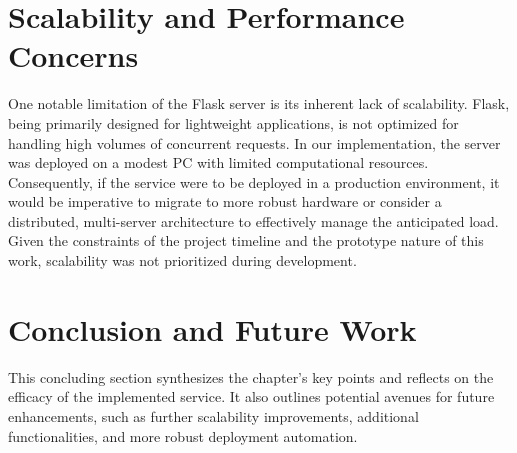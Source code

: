 \author{Florian Prandstetter}

\section{Scalability and Performance Concerns}

One notable limitation of the Flask server is its inherent lack of scalability. Flask, being primarily designed for lightweight applications, is not optimized for handling high volumes of concurrent requests. In our implementation, the server was deployed on a modest PC with limited computational resources. Consequently, if the service were to be deployed in a production environment, it would be imperative to migrate to more robust hardware or consider a distributed, multi-server architecture to effectively manage the anticipated load. Given the constraints of the project timeline and the prototype nature of this work, scalability was not prioritized during development.


\section{Conclusion and Future Work}
This concluding section synthesizes the chapter’s key points and reflects on the efficacy of the implemented service. It also outlines potential avenues for future enhancements, such as further scalability improvements, additional functionalities, and more robust deployment automation.





